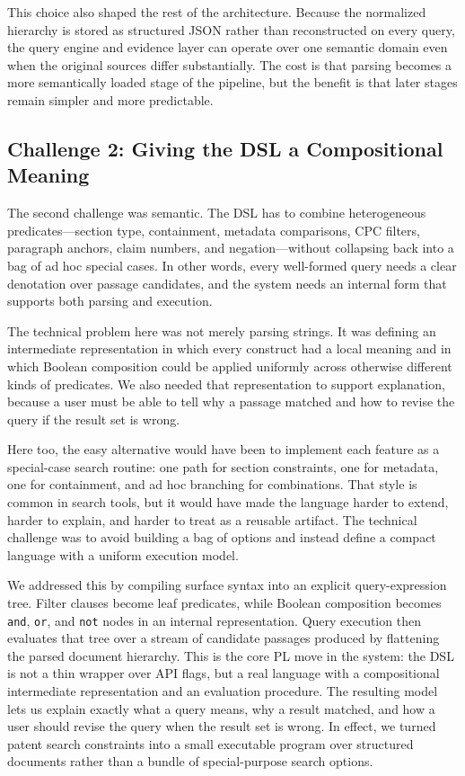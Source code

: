 \documentclass[sigconf]{acmart}
\begin{document}
This choice also shaped the rest of the architecture. Because the normalized
hierarchy is stored as structured JSON rather than reconstructed on every query,
the query engine and evidence layer can operate over one semantic domain even
when the original sources differ substantially. The cost is that parsing becomes
a more semantically loaded stage of the pipeline, but the benefit is that later
stages remain simpler and more predictable.

\subsection{Challenge 2: Giving the DSL a Compositional Meaning}

The second challenge was semantic. The DSL has to combine heterogeneous
predicates---section type, containment, metadata comparisons, CPC filters,
paragraph anchors, claim numbers, and negation---without collapsing back into a
bag of ad hoc special cases. In other words, every well-formed query needs a
clear denotation over passage candidates, and the system needs an internal form
that supports both parsing and execution.

The technical problem here was not merely parsing strings. It was defining an
intermediate representation in which every construct had a local meaning and in
which Boolean composition could be applied uniformly across otherwise different
kinds of predicates. We also needed that representation to support explanation,
because a user must be able to tell why a passage matched and how to revise the
query if the result set is wrong.

Here too, the easy alternative would have been to implement each feature as a
special-case search routine: one path for section constraints, one for metadata,
one for containment, and ad hoc branching for combinations. That style is common
in search tools, but it would have made the language harder to extend, harder to
explain, and harder to treat as a reusable artifact. The technical challenge was
to avoid building a bag of options and instead define a compact language with a
uniform execution model.

We addressed this by compiling surface syntax into an explicit query-expression
tree. Filter clauses become leaf predicates, while Boolean composition becomes
\texttt{and}, \texttt{or}, and \texttt{not} nodes in an internal
representation. Query execution then evaluates that tree over a stream of
candidate passages produced by flattening the parsed document hierarchy. This is
the core PL move in the system: the DSL is not a thin wrapper over API flags,
but a real language with a compositional intermediate representation and an
evaluation procedure. The resulting model lets us explain exactly what a query
means, why a result matched, and how a user should revise the query when the
result set is wrong. In effect, we turned patent search constraints into a
small executable program over structured documents rather than a bundle of
special-purpose search options.
\end{document}
